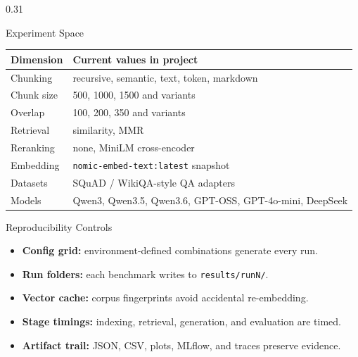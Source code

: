 \documentclass[final]{beamer}
\newcommand{\metric}[2]{\textbf{\textcolor{PosterTeal}{#1}} #2}
\newcommand{\blockheading}[2]{\faIcon{#1}\hspace{0.45em}#2}
\begin{document}
\begin{frame}[t]
\begin{columns}[T,totalwidth=\textwidth]
\begin{column}{0.31\textwidth}
\begin{block}{\blockheading{sliders-h}{Experiment Space}}
\begin{tabular}{ll}
\toprule
Dimension & Current values in project \\
\midrule
Chunking & recursive, semantic, text, token, markdown \\
Chunk size & 500, 1000, 1500 and variants \\
Overlap & 100, 200, 350 and variants \\
Retrieval & similarity, MMR \\
Reranking & none, MiniLM cross-encoder \\
Embedding & \texttt{nomic-embed-text:latest} snapshot \\
Datasets & SQuAD / WikiQA-style QA adapters \\
Models & Qwen3, Qwen3.5, Qwen3.6, GPT-OSS, GPT-4o-mini, DeepSeek \\
\bottomrule
\end{tabular}
\end{block}

\begin{block}{\blockheading{redo}{Reproducibility Controls}}
\begin{itemize}\setlength\itemsep{0.04cm}
  \item \metric{Config grid:}{environment-defined combinations generate every run.}
  \item \metric{Run folders:}{each benchmark writes to \texttt{results/runN/}.}
  \item \metric{Vector cache:}{corpus fingerprints avoid accidental re-embedding.}
  \item \metric{Stage timings:}{indexing, retrieval, generation, and evaluation are timed.}
  \item \metric{Artifact trail:}{JSON, CSV, plots, MLflow, and traces preserve evidence.}
\end{itemize}
\end{block}


\end{column}
\end{columns}
\end{frame}
\end{document}
